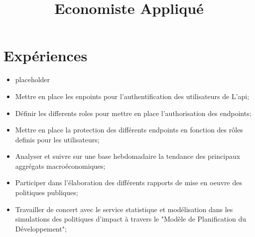 \documentclass[11pt,a4paper]{moderncv}
\title{Economiste Appliqu\'{e}}
\begin{document}
\maketitle
\section{Expériences}
{
	\begin{itemize}%
		\item  placeholder
	\end{itemize}
}

{
	\begin{itemize}%
		\item  Mettre en place les enpoints pour l'authentification des utilisateurs de L'api;
		\item  D\'{e}finir les differents roles pour mettre en place l'authorisation des endpoints;
		\item  Mettre en place la protection des diff\'{e}rents endpoints en fonction des r\^{o}les definis pour les utilisateurs;
	\end{itemize}
}

{
	\begin{itemize}%
		\item  Analyser et suivre sur une base hebdomadaire  la tendance des principaux aggr\'{e}gats macro\'{e}conomiques;
		\item Participer dans l'\'{e}laboration des diff\'{e}rents rapports de mise en oeuvre des politiques publiques;
		\item Travailler de concert avec le service statistique et mod\'{e}lisation dans les simulations des politiques d'impact \`{a} travers le "Mod\`{e}le de Planification du D\'{e}veloppement";
	\end{itemize}
}
\end{document}

